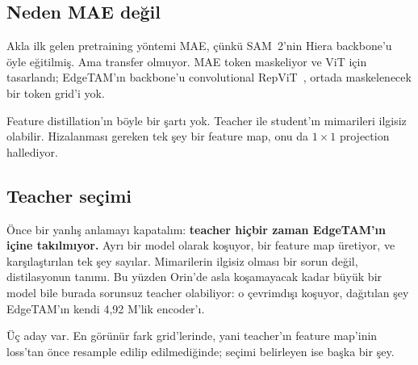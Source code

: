 \subsection*{Neden MAE değil}

Akla ilk gelen pretraining yöntemi MAE, çünkü SAM~2'nin Hiera backbone'u
öyle eğitilmiş. Ama transfer olmuyor. MAE token maskeliyor ve ViT için
tasarlandı; EdgeTAM'ın backbone'u convolutional
RepViT~\cite{wang2023repvit}, ortada maskelenecek bir token grid'i yok.

Feature distillation'ın böyle bir şartı yok. Teacher ile student'ın
mimarileri ilgisiz olabilir. Hizalanması gereken tek şey bir feature map,
onu da $1{\times}1$ projection hallediyor.

\subsection*{Teacher seçimi}

Önce bir yanlış anlamayı kapatalım: \textbf{teacher hiçbir zaman EdgeTAM'ın
içine takılmıyor.} Ayrı bir model olarak koşuyor, bir feature map üretiyor,
ve karşılaştırılan tek şey sayılar. Mimarilerin ilgisiz olması bir sorun
değil, distilasyonun tanımı. Bu yüzden Orin'de asla koşamayacak kadar büyük
bir model bile burada sorunsuz teacher olabiliyor: o çevrimdışı koşuyor,
dağıtılan şey EdgeTAM'ın kendi 4,92 M'lik encoder'ı.

Üç aday var. En görünür fark grid'lerinde, yani teacher'ın feature
map'inin loss'tan önce resample edilip edilmediğinde; seçimi belirleyen ise
başka bir şey.

